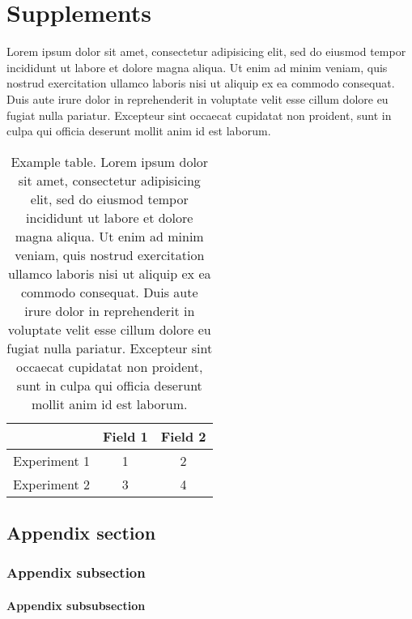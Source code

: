 
\chapter{Supplements}

Lorem ipsum dolor sit amet, consectetur adipisicing elit, sed do eiusmod
tempor incididunt ut labore et dolore magna aliqua. Ut enim ad minim veniam,
quis nostrud exercitation ullamco laboris nisi ut aliquip ex ea commodo
consequat. Duis aute irure dolor in reprehenderit in voluptate velit esse
cillum dolore eu fugiat nulla pariatur. Excepteur sint occaecat cupidatat non
proident, sunt in culpa qui officia deserunt mollit anim id est laborum.

\begin{table}[ht]
	\caption[Example table]{Example table. Lorem ipsum dolor sit amet, consectetur adipisicing elit, sed do eiusmod
	tempor incididunt ut labore et dolore magna aliqua. Ut enim ad minim veniam,
	quis nostrud exercitation ullamco laboris nisi ut aliquip ex ea commodo
	consequat. Duis aute irure dolor in reprehenderit in voluptate velit esse
	cillum dolore eu fugiat nulla pariatur. Excepteur sint occaecat cupidatat non
	proident, sunt in culpa qui officia deserunt mollit anim id est laborum.}
	\label{tab:tablename}
	\centering
	\begin{tabular}{lcc}
	\toprule
		& Field 1 & Field 2 \\
	\midrule
	Experiment 1 & 1 & 2 \\
	Experiment 2 & 3 & 4 \\
	\bottomrule
	\end{tabular}
\end{table}

\section{Appendix section}

\subsection{Appendix subsection}

\subsubsection{Appendix subsubsection}